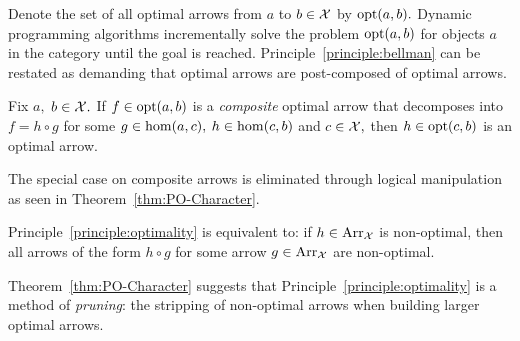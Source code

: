 \documentclass[a4paper]{ifacconf}
\begin{document}
Denote the set of all optimal arrows from \(a\) to \(b \in \mathcal{X}\) by \(\mathrm{opt}(a, b).\)
Dynamic programming algorithms incrementally solve the problem \(\mathrm{opt}(a, b)\) for objects \(a\) in the category until the goal is reached.
Principle~\ref{principle:bellman} can be restated as demanding that optimal arrows are post-composed of optimal arrows.
%
\begin{prin}
  \label{principle:optimality}
  Fix \(a,\) \(b \in \mathcal{X}.\)
  If \(f \in \mathrm{opt}(a, b)\) is a \emph{composite} optimal arrow that decomposes into \(f = h \circ g\) for some \(g \in \mathrm{hom}(a, c),\) \(h \in \mathrm{hom}(c, b)\) and \(c \in \mathcal{X},\)
  then \(h \in \mathrm{opt}(c, b)\) is an optimal arrow.
\end{prin}
%
The special case on composite arrows is eliminated through logical manipulation as seen in Theorem~\ref{thm:PO-Character}.
%
\begin{thm}
  \label{thm:PO-Character}
  Principle~\ref{principle:optimality} is equivalent to: if \(h \in \mathrm{Arr}_{\mathcal{X}}\) is non-optimal, then all arrows of the form \(h \circ g\) for some arrow \(g \in \mathrm{Arr}_{\mathcal{X}}\) are non-optimal.
\end{thm}
%
Theorem~\ref{thm:PO-Character} suggests that Principle~\ref{principle:optimality} is a method of \emph{pruning}:
the stripping of non-optimal arrows when building larger optimal arrows.
\end{document}
